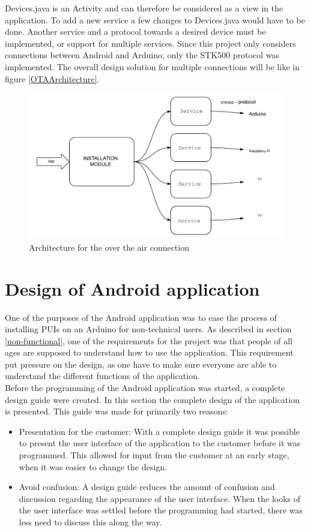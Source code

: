 	Devices.java is an Activity and can therefore be considered as a view in the application. To add a new service a few changes to Devices.java would have to be done. Another service and a protocol towards a desired device must be implemented, or support for multiple services. Since this project only considers connections between Android and Arduino, only the STK500 protocol was implemented.
	The overall design solution for multiple connections will be like in figure \ref{OTAArchitecture}.\\
	\begin{figure}[H]
	\includegraphics[scale=0.7]{figures/OTAArchitecture.pdf}
	\caption{Architecture for the over the air connection}
	\label{fig:OTAArchitecture}
	\end{figure}

\section{Design of Android application}
One of the purposes of the Android application was to ease the process of installing PUIs on an Arduino for non-technical users. As described in section \ref{non-functional}, one of the requirements for the project was that people of all ages are supposed to understand how to use the application. This requirement put pressure on the design, as one have to make sure everyone are able to understand the different functions of the application. \\
\newline
Before the programming of the Android application was started, a complete design guide were created. In this section the complete design of the application is presented. This guide was made for primarily two reasons:
\begin{itemize}
	\item{Presentation for the customer:} With a complete design guide it was possible to present the user interface of the application to the customer before it was programmed. This allowed for input from the customer at an early stage, when it was easier to change the design.
	\item{Avoid confusion:} A design guide reduces the amount of confusion and discussion regarding the appearance of the user interface. When the looks of the user interface was settled before the programming had started, there was less need to discuss this along the way.
\end{itemize}


